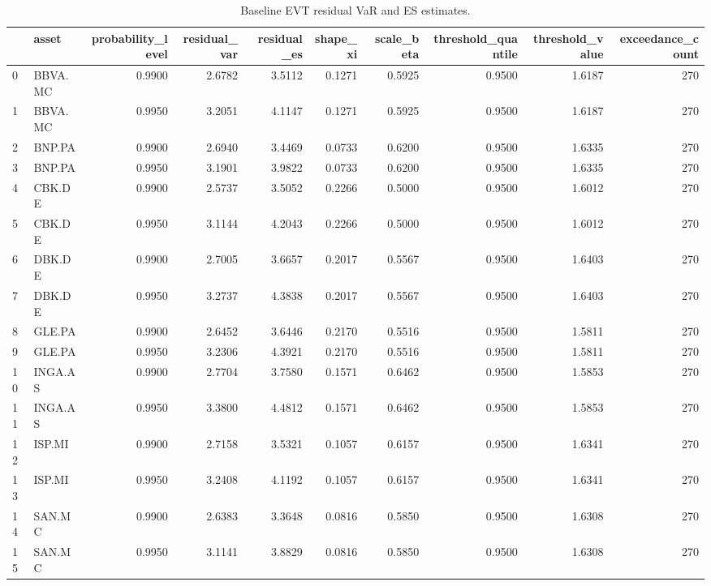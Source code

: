 \begin{table}
\caption{Baseline EVT residual VaR and ES estimates.}
\label{tab:evt_var_es_baseline}
\begin{tabular}{llrrrrrrrr}
\toprule
 & asset & probability_level & residual_var & residual_es & shape_xi & scale_beta & threshold_quantile & threshold_value & exceedance_count \\
\midrule
0 & BBVA.MC & 0.9900 & 2.6782 & 3.5112 & 0.1271 & 0.5925 & 0.9500 & 1.6187 & 270 \\
1 & BBVA.MC & 0.9950 & 3.2051 & 4.1147 & 0.1271 & 0.5925 & 0.9500 & 1.6187 & 270 \\
2 & BNP.PA & 0.9900 & 2.6940 & 3.4469 & 0.0733 & 0.6200 & 0.9500 & 1.6335 & 270 \\
3 & BNP.PA & 0.9950 & 3.1901 & 3.9822 & 0.0733 & 0.6200 & 0.9500 & 1.6335 & 270 \\
4 & CBK.DE & 0.9900 & 2.5737 & 3.5052 & 0.2266 & 0.5000 & 0.9500 & 1.6012 & 270 \\
5 & CBK.DE & 0.9950 & 3.1144 & 4.2043 & 0.2266 & 0.5000 & 0.9500 & 1.6012 & 270 \\
6 & DBK.DE & 0.9900 & 2.7005 & 3.6657 & 0.2017 & 0.5567 & 0.9500 & 1.6403 & 270 \\
7 & DBK.DE & 0.9950 & 3.2737 & 4.3838 & 0.2017 & 0.5567 & 0.9500 & 1.6403 & 270 \\
8 & GLE.PA & 0.9900 & 2.6452 & 3.6446 & 0.2170 & 0.5516 & 0.9500 & 1.5811 & 270 \\
9 & GLE.PA & 0.9950 & 3.2306 & 4.3921 & 0.2170 & 0.5516 & 0.9500 & 1.5811 & 270 \\
10 & INGA.AS & 0.9900 & 2.7704 & 3.7580 & 0.1571 & 0.6462 & 0.9500 & 1.5853 & 270 \\
11 & INGA.AS & 0.9950 & 3.3800 & 4.4812 & 0.1571 & 0.6462 & 0.9500 & 1.5853 & 270 \\
12 & ISP.MI & 0.9900 & 2.7158 & 3.5321 & 0.1057 & 0.6157 & 0.9500 & 1.6341 & 270 \\
13 & ISP.MI & 0.9950 & 3.2408 & 4.1192 & 0.1057 & 0.6157 & 0.9500 & 1.6341 & 270 \\
14 & SAN.MC & 0.9900 & 2.6383 & 3.3648 & 0.0816 & 0.5850 & 0.9500 & 1.6308 & 270 \\
15 & SAN.MC & 0.9950 & 3.1141 & 3.8829 & 0.0816 & 0.5850 & 0.9500 & 1.6308 & 270 \\
\bottomrule
\end{tabular}
\end{table}
